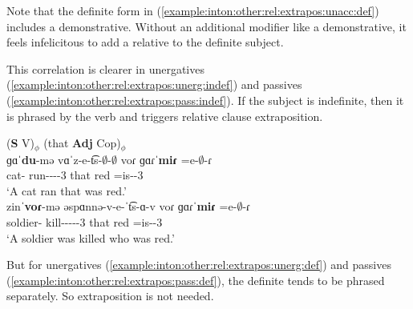 Note that the definite form in (\ref{example:inton:other:rel:extrapos:unacc:def}) includes a demonstrative. Without an additional modifier like a demonstrative, it feels infelicitous to add a relative to the definite subject.

This correlation is clearer in unergatives (\ref{example:inton:other:rel:extrapos:unerg:indef}) and passives (\ref{example:inton:other:rel:extrapos:pass:indef}). If the subject is indefinite, then it is phrased by the verb and triggers relative clause extraposition. 


\begin{exe}
	\ex \begin{xlist}
		\ex \glll (\textbf{S} V)$_\phi$  (that \textbf{Adj} Cop)$_\phi$  \\
		ɡɑˈ\textbf{du}-mə vɑˈz-e-t͡s-$\emptyset$-$\emptyset$ voɾ ɡɑɾ\textbf{ˈmiɾ} =e-$\emptyset$-ɾ  \\
		cat-{\indf} run-{\thgloss}-{\aorperf}-{\pst}-3{\sg} that red =is-{\pst}-3{\sg} \\
		\trans `A cat ran that was red.'
		\label{example:inton:other:rel:extrapos:unerg:indef}
		\\ 
		\ex \gll%
		zinˈ\textbf{voɾ}-mə əspɑnnə-v-e-ˈt͡s-ɑ-v  voɾ ɡɑɾ\textbf{ˈmiɾ} =e-$\emptyset$-ɾ  \\
		soldier-{\indf} kill-{\pass}-{\thgloss}-{\aorperf}-{\pst}-3{\sg} that red =is-{\pst}-3{\sg} \\
		\trans `A soldier was killed   who was red.'
		\label{example:inton:other:rel:extrapos:pass:indef}
		\\ 
	\end{xlist}
\end{exe}

But for unergatives (\ref{example:inton:other:rel:extrapos:unerg:def}) and passives (\ref{example:inton:other:rel:extrapos:pass:def}),   the definite tends to be phrased separately. So extraposition is not needed. 



